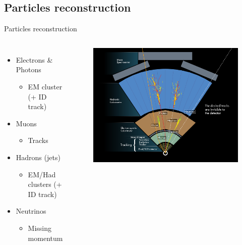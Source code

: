 \subsection{Particles reconstruction}
\begin{frame}{Particles reconstruction}

\begin{columns}

\begin{itemize}
    \item \textcolor{HHred}{Electrons} \& \textcolor{HHred}{Photons}
    \begin{itemize}
        \item EM cluster (+ ID track)
    \end{itemize}
    \item \textcolor{cadmiumorange}{Muons}
    \begin{itemize}
        \item Tracks
    \end{itemize}
    \item \textcolor{applegreen}{Hadrons} (jets)
    \begin{itemize}
        \item EM/Had clusters (+ ID track)
    \end{itemize}
    \item \textcolor{HHturquoise_l}{Neutrinos}
    \begin{itemize}
        \item Missing momentum
    \end{itemize}
\end{itemize}
\begin{figure}
    \centering
    \includegraphics[width=1.\textwidth]{Part2/Img/Particle_detection.jpg}
   
\end{figure}

\end{columns}

\end{frame}

